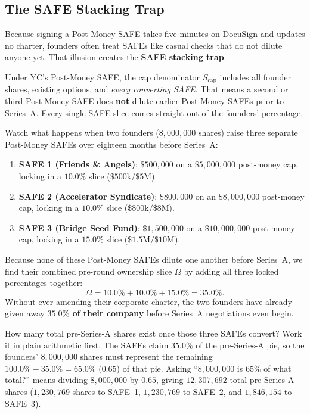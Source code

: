 \subsection{The SAFE Stacking Trap}

Because signing a Post-Money SAFE takes five minutes on DocuSign and updates no charter, founders often treat SAFEs like casual checks that do not dilute anyone yet. That illusion creates the \textbf{SAFE stacking trap}.

Under YC's Post-Money SAFE, the cap denominator $S_{\text{cap}}$ includes all founder shares, existing options, and \emph{every converting SAFE}. That means a second or third Post-Money SAFE does \textbf{not} dilute earlier Post-Money SAFEs prior to Series~A. Every single SAFE slice comes straight out of the founders' percentage.

Watch what happens when two founders ($8{,}000{,}000$ shares) raise three separate Post-Money SAFEs over eighteen months before Series~A:
\begin{enumerate}
  \item \textbf{SAFE 1 (Friends \& Angels)}: $\$500{,}000$ on a $\$5{,}000{,}000$ post-money cap, locking in a $10.0\%$ slice ($\$500\text{k} / \$5\text{M}$).
  \item \textbf{SAFE 2 (Accelerator Syndicate)}: $\$800{,}000$ on an $\$8{,}000{,}000$ post-money cap, locking in a $10.0\%$ slice ($\$800\text{k} / \$8\text{M}$).
  \item \textbf{SAFE 3 (Bridge Seed Fund)}: $\$1{,}500{,}000$ on a $\$10{,}000{,}000$ post-money cap, locking in a $15.0\%$ slice ($\$1.5\text{M} / \$10\text{M}$).
\end{enumerate}

Because none of these Post-Money SAFEs dilute one another before Series~A, we find their combined pre-round ownership slice $\Omega$ by adding all three locked percentages together:
\[
  \Omega = 10.0\% + 10.0\% + 15.0\% = 35.0\%.
\]
Without ever amending their corporate charter, the two founders have already given away \textbf{$35.0\%$ of their company} before Series~A negotiations even begin.

How many total pre-Series-A shares exist once those three SAFEs convert? Work it in plain arithmetic first. The SAFEs claim $35.0\%$ of the pre-Series-A pie, so the founders' $8{,}000{,}000$ shares must represent the remaining $100.0\% - 35.0\% = 65.0\%$ ($0.65$) of that pie. Asking ``$8{,}000{,}000$ is $65\%$ of what total?'' means dividing $8{,}000{,}000$ by $0.65$, giving $12{,}307{,}692$ total pre-Series-A shares ($1{,}230{,}769$ shares to SAFE~1, $1{,}230{,}769$ to SAFE~2, and $1{,}846{,}154$ to SAFE~3).

